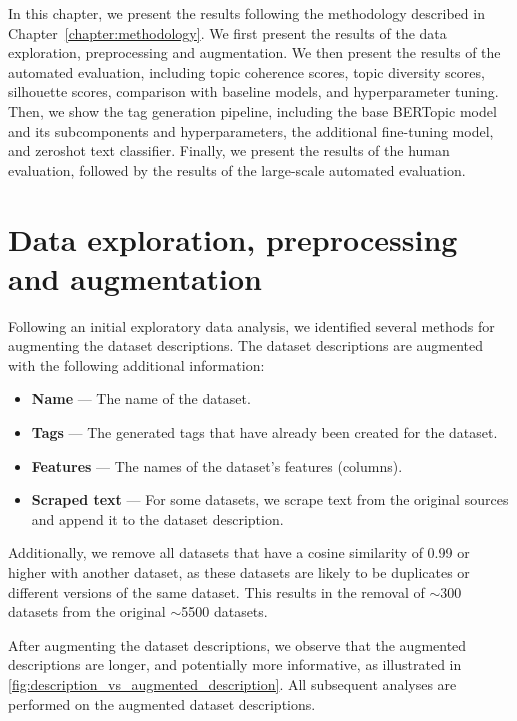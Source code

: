In this chapter, we present the results following the methodology described in Chapter~\ref{chapter:methodology}. We first present the results of the data exploration, preprocessing and augmentation. We then present the results of the automated evaluation, including topic coherence scores, topic diversity scores, silhouette scores, comparison with baseline models, and hyperparameter tuning. Then, we show the tag generation pipeline, including the base BERTopic model and its subcomponents and hyperparameters, the additional fine-tuning model, and zeroshot text classifier. Finally, we present the results of the human evaluation, followed by the results of the large-scale automated evaluation.

\section{Data exploration, preprocessing and augmentation}
\label{sec:data_exploration}
Following an initial exploratory data analysis, we identified several methods for augmenting the dataset descriptions. The dataset descriptions are augmented with the following additional information:

\begin{itemize}
    \item \textbf{Name} — The name of the dataset.
    \item \textbf{Tags} — The generated tags that have already been created for the dataset.
    \item \textbf{Features} — The names of the dataset's features (columns).
    \item \textbf{Scraped text} — For some datasets, we scrape text from the original sources and append it to the dataset description.
\end{itemize}

Additionally, we remove all datasets that have a cosine similarity of 0.99 or higher with another dataset, as these datasets are likely to be duplicates or different versions of the same dataset. This results in the removal of $\sim$300 datasets from the original $\sim$5500 datasets.

After augmenting the dataset descriptions, we observe that the augmented descriptions are longer, and potentially more informative, as illustrated in \cref{fig:description_vs_augmented_description}. All subsequent analyses are performed on the augmented dataset descriptions.

